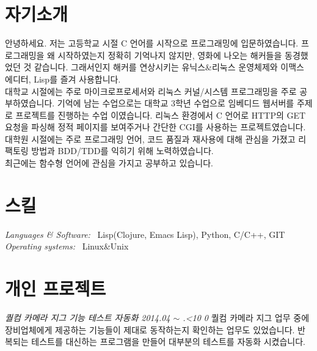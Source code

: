 \documentclass[line,margin]{res}
\renewcommand{\today}{\number\year.\ifnum\number\month<10 0\fi \number\month}
\begin{document}
\address{E-mail: vmfhrmfoaj@yahoo.com}


\begin{resume}

  \section{자기소개}

  안녕하세요.
  저는 고등학교 시절 C 언어를 시작으로 프로그래밍에 입문하였습니다.
  프로그래밍을 왜 시작하였는지 정확히 기억나지 않지만, 영화에 나오는 해커들을 동경했었던 것 같습니다.
  그래서인지 해커를 연상시키는 유닉스\&리눅스 운영체제와 이맥스 에디터, Lisp를 즐겨 사용합니다. \\
  대학교 시절에는 주로 마이크로프로세서와 리눅스 커널/시스템 프로그래밍을 주로 공부하였습니다.
  기억에 남는 수업으로는 대학교 3학년 수업으로 임베디드 웹서버를 주제로 프로젝트를 진행하는 수업 이였습니다.
  리눅스 환경에서 C 언어로 HTTP의 GET 요청을 파싱해 정적 페이지를 보여주거나 간단한 CGI를 사용하는 프로젝트였습니다. \\
  대학원 시절에는 주로 프로그래밍 언어, 코드 품질과 재사용에 대해 관심을 가졌고
  리팩토링 방법과 BDD/TDD를 익히기 위해 노력하였습니다. \\
  최근에는 함수형 언어에 관심을 가지고 공부하고 있습니다.



  \section{스킬}

  {\sl Languages \& Software:} ~Lisp({\small Clojure, Emacs Lisp}), Python, C/C++, GIT \\
  {\sl Operating systems:} ~Linux\&Unix


  \section{개인 프로젝트}

  {\sl 퀄컴 카메라 지그 기능 테스트 자동화 \hfill 2014.04 $\sim$ \today}
  \vspace{1mm}
  \newline
  {
    \small
    퀄컴 카메라 지그 업무 중에 장비업체에게 제공하는 기능들이 제대로 동작하는지 확인하는 업무도 있었습니다.
    반복되는 테스트를 대신하는 프로그램을 만들어 대부분의 테스트를 자동화 시켰습니다.
  }



\end{resume}
\end{document}

